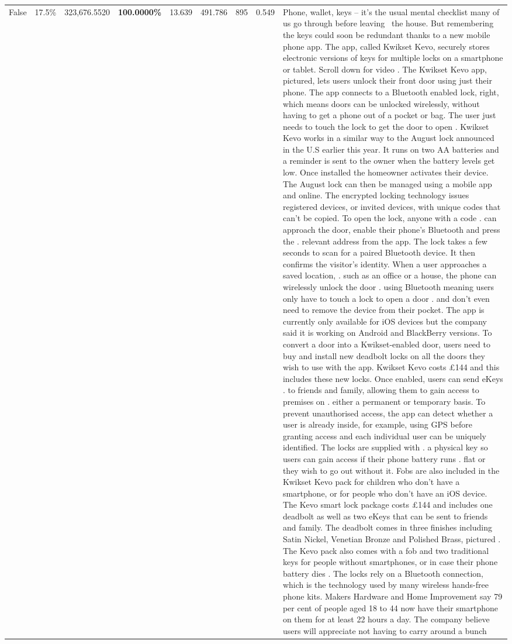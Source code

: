 \begin{table}[H]
\begin{tabular}{lllrlllll}
False & 17.5\% & 323,676.5520 & \bfseries \color{red} 100.0000\% & 13.639 & 491.786 & 895 & 0.549 & Phone, wallet, keys – it’s the usual mental checklist many of us go through before leaving  the house. But remembering the keys could soon be redundant thanks to a new mobile phone app. The app, called Kwikset Kevo, securely stores electronic versions of keys for multiple locks on a smartphone or tablet. Scroll down for video . The Kwikset Kevo app, pictured, lets users unlock their front door using just their phone. The app connects to a Bluetooth enabled lock, right, which means doors can be unlocked wirelessly, without having to get a phone out of a pocket or bag. The user just needs to touch the lock to get the door to open . Kwikset Kevo works in a similar way to the August lock announced in the U.S earlier this year. It runs on two AA batteries and a reminder is sent to the owner when the battery levels get low. Once installed the homeowner activates their device. The August lock can then be managed using a mobile app and online. The encrypted locking technology issues registered devices, or invited devices, with unique codes that can't be copied. To open the lock, anyone with a code . can approach the door, enable their phone's Bluetooth and press the . relevant address from the app. The lock takes a few seconds to scan for a paired Bluetooth device. It then confirms the visitor's identity. When a user approaches a saved location, . such as an office or a house, the phone can wirelessly unlock the door . using Bluetooth meaning users only have to touch a lock to open a door . and don't even need to remove the device from their pocket. The app is currently only available for iOS devices but the company said it is working on Android and BlackBerry versions. To convert a door into a Kwikset-enabled door, users need to buy and install new deadbolt locks on all the doors they wish to use with the app. Kwikset Kevo costs £144 and this includes these new locks. Once enabled, users can send eKeys . to friends and family, allowing them to gain access to premises on . either a permanent or temporary basis. To prevent unauthorised access, the app can detect whether a user is already inside, for example, using GPS before granting access and each individual user can be uniquely identified. The locks are supplied with . a physical key so users can gain access if their phone battery runs . flat or they wish to go out without it. Fobs are also included in the Kwikset Kevo pack for children who don't have a smartphone, or for people who don't have an iOS device. The Kevo smart lock package costs £144 and includes one deadbolt as well as two eKeys that can be sent to friends and family. The deadbolt comes in three finishes including Satin Nickel, Venetian Bronze and Polished Brass, pictured . The Kevo pack also comes with a fob and two traditional keys for people without smartphones, or in case their phone battery dies . The locks rely on a Bluetooth connection, which is the technology used by many wireless hands-free phone kits. Makers Hardware and Home Improvement say 79 per cent of people aged 18 to 44 now have their smartphone on them for at least 22 hours a day. The company believe users will appreciate not having to carry around a bunch 
\end{tabular}
\end{table}
